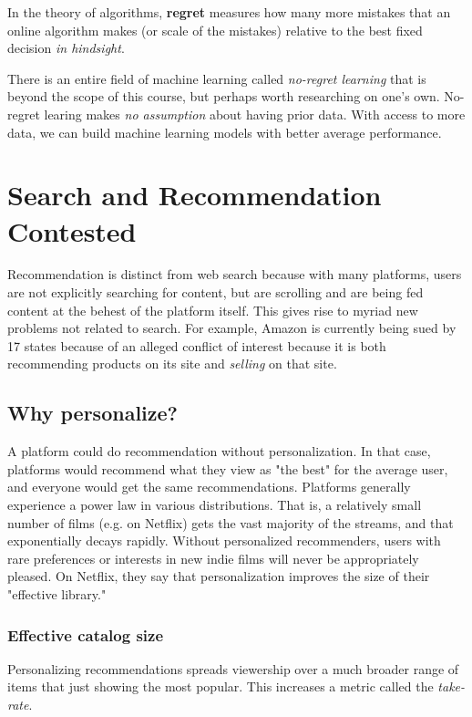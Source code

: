 \documentclass[titlepage, 12pt, leqno]{article}
\begin{document}
\begin{definition}
    In the theory of algorithms, \textbf{regret} measures how many more mistakes
    that an online algorithm makes (or scale of the mistakes) relative to the best
    fixed decision \textit{in hindsight}.
    \begin{note}
        There is an entire field of machine learning called \textit{no-regret
        learning} that is beyond the scope of this course, but perhaps worth
        researching on one's own.
        No-regret learing makes \textit{no assumption} about having prior data. 
        With  access to more data, we can build machine learning models with
        better average performance.
    \end{note}
\end{definition}

\pagebreak
\section{Search and Recommendation Contested}

Recommendation is distinct from web search because with many platforms, users
are not explicitly searching for content, but are scrolling and are being fed
content at the behest of the platform itself. This gives rise to myriad new 
problems not related to search. For example, Amazon is currently being sued by
17 states because of an alleged conflict of interest because it is both
recommending products on its site and \textit{selling} on that site.

\subsection{Why personalize?}
A platform could do recommendation without personalization. In that case, 
platforms would recommend what they view as "the best" for the average user, and
everyone would get the same recommendations. Platforms generally experience a
power law in various distributions. That is, a relatively small number of films
(e.g. on Netflix) gets the vast majority of the streams, and that exponentially
decays rapidly. Without personalized recommenders, users with rare preferences or
interests in new indie films will never be appropriately pleased. On Netflix, 
they say that personalization improves the size of their "effective library."

\subsubsection{Effective catalog size}
Personalizing recommendations spreads viewership over a much broader range of
items that just showing the most popular. This increases a metric called the
\textit{take-rate}.
\end{document}
